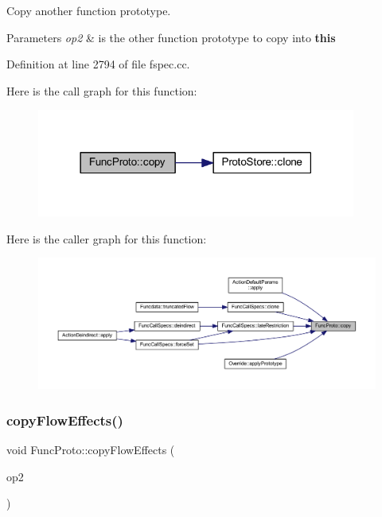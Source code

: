 Copy another function prototype. 


\begin{DoxyParams}{Parameters}
{\em op2} & is the other function prototype to copy into {\bfseries{this}} \\
\hline
\end{DoxyParams}


Definition at line 2794 of file fspec.\+cc.

Here is the call graph for this function\+:
\nopagebreak
\begin{figure}[H]
\begin{center}
\leavevmode
\includegraphics[width=297pt]{class_func_proto_a9bd4f3bc764b11b57f4e71b9d19df27d_cgraph}
\end{center}
\end{figure}
Here is the caller graph for this function\+:
\nopagebreak
\begin{figure}[H]
\begin{center}
\leavevmode
\includegraphics[width=350pt]{class_func_proto_a9bd4f3bc764b11b57f4e71b9d19df27d_icgraph}
\end{center}
\end{figure}
\mbox{\label{class_func_proto_ace26c345cdf567de704b24cd99e8a254}} 
\subsubsection{\texorpdfstring{copyFlowEffects()}{copyFlowEffects()}}
{\footnotesize\ttfamily void Func\+Proto\+::copy\+Flow\+Effects (\begin{DoxyParamCaption}\item[{const \mbox{\hyperlink{class_func_proto}{Func\+Proto}} \&}]{op2 }\end{DoxyParamCaption})}



